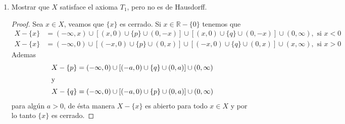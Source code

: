 \begin{enumerate}
        \begin{proof}
            Sea
            \begin{align*}
                f: X-\{p\} &\longrightarrow \mathbb{R}\\ 
                x &\longmapsto \begin{cases}
                    x & \text{si }  x \in \mathbb{R}-\{0\}\\
                    0 & \text{si } x = q 
                \end{cases} 
            \end{align*}
            $f$ claramente es biyectiva, hay que ver que es contínua, note que $f|_{\mathbb{R}-\{0\}}=Id_{\mathbb{R}-\{0\}}$, luego, si probamos que $f$ es contínua en $q$ tendremos que $f$ es contínua. Sea $U$ una vecindad básica de $0=f(q)$, es decir $U = (a,b)$ con $a < 0 < b$, luego $f^{-1}(U)=(a,0) \cup \{q\} \cup (0,b)$ si tomamos $0 < c \leq \min\{|a|,|b|\}$, tenemos que $(-c,0) \cup \{q\} \cup (0, c)$ es una vecindad de $q$ contenida en $f^{-1}(U)$, por lo tanto $f$ es contínua en $q$. Ahora veamos que $f$ es abierta, para esto solo necesitamos verificar que la imagen de un abierto básico es abierta en $\mathbb{R}$, sea $U$ un abierto básico de $X-\{p\}$, si $U$ es un intervalo abierto que no contiene al 0, $f(U)$ es él mismo, si $U$ es de la forma $(-a,0)\cup \{q\} \cup (0,a)$, entonces $f(U)=(-a,a)$, el cual es abierto en $\mathbb{R}$, por tanto al ser $f$ continua, biyectiva y abierta, es un homeomorfismo. Para ver que $X-\{q\}$ es isomorfo a $\mathbb{R}$ la prueba es análoga.
        \end{proof}
        \item Mostrar que \( X \) satisface el axioma \( T_1 \), pero no es de Hausdorff.
        \begin{proof}
            Sea $x\in X$, veamos que $\{x\}$ es cerrado. 
            Si $x \in \mathbb{R}-\{0\}$ tenemos que
            \begin{align*}
                X-\{x\} &= (-\infty,x) \cup [(x,0) \cup \{p\} \cup (0,-x)] \cup [(x,0) \cup \{q\} \cup (0,-x)] \cup (0,\infty), \text{  si } x<0\\
                X-\{x\} &=(-\infty,0) \cup [(-x,0) \cup \{p\} \cup (0,x)] \cup [(-x,0) \cup \{q\} \cup (0,x)] \cup (x,\infty), \text{  si } x>0
            \end{align*}
            Ademas 
            \begin{align*}
                X-\{p\} & = (-\infty,0) \cup [(-a,0) \cup \{q\} \cup (0,a)] \cup (0,\infty)\\
                \intertext{y}
                X-\{q\} & = (-\infty,0) \cup [(-a,0) \cup \{p\} \cup (0,a)] \cup (0,\infty)
            \end{align*}
            para algún $a>0$, de ésta manera $X-\{x\}$ es abierto para todo $x \in X$ y por lo tanto $\{x\}$ es cerrado.


\end{proof}
\end{enumerate}
